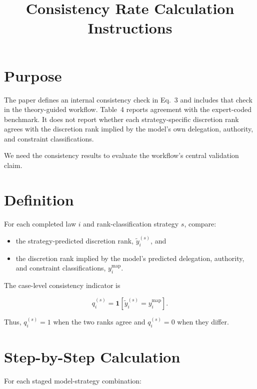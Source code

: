 \documentclass[11pt]{article}
\title{Consistency Rate Calculation Instructions}
\date{}
\begin{document}
\maketitle

\section*{Purpose}

The paper defines an internal consistency check in Eq.~3 and includes that check in the theory-guided workflow. Table~4 reports agreement with the expert-coded benchmark. It does not report whether each strategy-specific discretion rank agrees with the discretion rank implied by the model's own delegation, authority, and constraint classifications.

We need the consistency results to evaluate the workflow's central validation claim.

\section*{Definition}

For each completed law $i$ and rank-classification strategy $s$, compare:

\begin{itemize}[nosep]
    \item the strategy-predicted discretion rank, $\tilde y_i^{(s)}$, and
    \item the discretion rank implied by the model's predicted delegation, authority, and constraint classifications, $y_i^{\mathrm{map}}$.
\end{itemize}

The case-level consistency indicator is

\[
q_i^{(s)}
=
\mathbf{1}
\left[
\tilde y_i^{(s)} = y_i^{\mathrm{map}}
\right].
\]

Thus, $q_i^{(s)}=1$ when the two ranks agree and $q_i^{(s)}=0$ when they differ.

\section*{Step-by-Step Calculation}

For each staged model-strategy combination:
\end{document}
